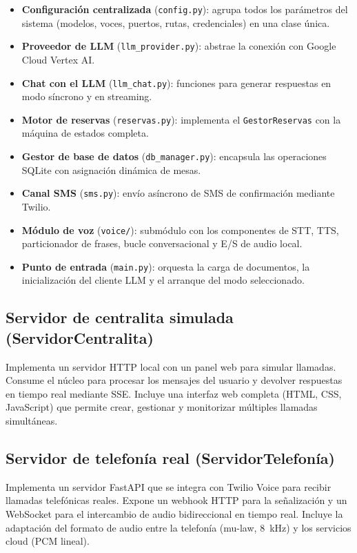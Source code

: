 \begin{itemize}
    \item \textbf{Configuración centralizada} (\texttt{config.py}): agrupa todos los parámetros del sistema (modelos, voces, puertos, rutas, credenciales) en una clase única.
    \item \textbf{Proveedor de LLM} (\texttt{llm\_provider.py}): abstrae la conexión con Google Cloud Vertex AI.
    \item \textbf{Chat con el LLM} (\texttt{llm\_chat.py}): funciones para generar respuestas en modo síncrono y en streaming.
    \item \textbf{Motor de reservas} (\texttt{reservas.py}): implementa el \texttt{GestorReservas} con la máquina de estados completa.
    \item \textbf{Gestor de base de datos} (\texttt{db\_manager.py}): encapsula las operaciones SQLite con asignación dinámica de mesas.
    \item \textbf{Canal SMS} (\texttt{sms.py}): envío asíncrono de SMS de confirmación mediante Twilio.
    \item \textbf{Módulo de voz} (\texttt{voice/}): submódulo con los componentes de STT, TTS, particionador de frases, bucle conversacional y E/S de audio local.
    \item \textbf{Punto de entrada} (\texttt{main.py}): orquesta la carga de documentos, la inicialización del cliente LLM y el arranque del modo seleccionado.
\end{itemize}

\subsection{Servidor de centralita simulada (ServidorCentralita)}
\label{subsec:servidor_centralita}

Implementa un servidor HTTP local con un panel web para simular llamadas. Consume el núcleo para procesar los mensajes del usuario y devolver respuestas en tiempo real mediante SSE. Incluye una interfaz web completa (HTML, CSS, JavaScript) que permite crear, gestionar y monitorizar múltiples llamadas simultáneas.

\subsection{Servidor de telefonía real (ServidorTelefonía)}
\label{subsec:servidor_telefonia}

Implementa un servidor FastAPI que se integra con Twilio Voice para recibir llamadas telefónicas reales. Expone un webhook HTTP para la señalización y un WebSocket para el intercambio de audio bidireccional en tiempo real. Incluye la adaptación del formato de audio entre la telefonía (mu-law, 8~kHz) y los servicios cloud (PCM lineal).

